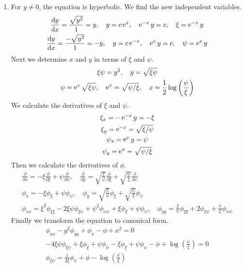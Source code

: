 {%
\begin{Solution}
  \label{solution transform phixx-y2phiyy+phix-phi+x2=0}
  \begin{enumerate}


  \item
    For $y \neq 0$, the equation is hyperbolic.  We find the new 
    independent variables.
    \begin{gather*}
      \frac{\mathrm{d} y}{\mathrm{d} x} = \frac{\sqrt{y^2}}{1} = y, \quad
      y = c \mathop{\mathrm{e}}\nolimits^x, \quad
      \mathop{\mathrm{e}}\nolimits^{-x} y = c, \quad
      \xi = \mathop{\mathrm{e}}\nolimits^{-x} y 
      \\
      \frac{\mathrm{d} y}{\mathrm{d} x} = \frac{-\sqrt{y^2}}{1} = -y, \quad
      y = c \mathop{\mathrm{e}}\nolimits^{-x}, \quad
      \mathop{\mathrm{e}}\nolimits^x y = c, \quad
      \psi = \mathop{\mathrm{e}}\nolimits^x y
    \end{gather*}
    Next we determine $x$ and $y$ in terms of $\xi$ and $\psi$.
    \begin{gather*}
      \xi \psi = y^2, \quad y = \sqrt{\xi \psi} 
      \\
      \psi = \mathop{\mathrm{e}}\nolimits^x \sqrt{\xi \psi}, \quad
      \mathop{\mathrm{e}}\nolimits^x = \sqrt{\psi / \xi}, \quad
      x = \frac{1}{2} \log \left( \frac{\psi}{\xi} \right)
    \end{gather*}
    We calculate the derivatives of $\xi$ and $\psi$.
    \begin{gather*}
      \xi_x = - \mathop{\mathrm{e}}\nolimits^{-x} y = - \xi 
      \\
      \xi_y = \mathop{\mathrm{e}}\nolimits^{-x} = \sqrt{\xi / \psi} 
      \\
      \psi_x = \mathop{\mathrm{e}}\nolimits^x y = \psi 
      \\
      \psi_y = \mathop{\mathrm{e}}\nolimits^x = \sqrt{\psi / \xi}
    \end{gather*}
    Then we calculate the derivatives of $\phi$.
    \begin{gather*}
      \frac{\partial}{\partial x} = - \xi \frac{\partial}{\partial \xi} + \psi \frac{\partial}{\partial \psi}, \quad
      \frac{\partial}{\partial y} = \sqrt{ \frac{\xi}{\psi} } \frac{\partial}{\partial \xi}
      + \sqrt{ \frac{\psi}{\xi} } \frac{\partial}{\partial \psi} 
      \\
      \phi_x = -\xi \phi_\xi + \psi \phi_\psi, \quad
      \phi_y = \sqrt{ \frac{\xi}{\psi} } \phi_\xi + \sqrt{ \frac{\psi}{\xi} } \phi_\psi 
      \\
      \phi_{x x} = \xi^2 \phi_{\xi \xi} - 2 \xi \psi \phi_{\xi \psi} + \psi^2 \phi_{\psi \psi} + \xi \phi_\xi + \psi \phi_\psi,
      \quad
      \phi_{y y} = \frac{\xi}{\psi} \phi_{\xi \xi} + 2 \phi_{\xi \psi} + \frac{\psi}{\xi} \phi_{\psi \psi}
    \end{gather*}
    Finally we transform the equation to canonical form.
    \begin{gather*}
      \phi_{x x} - y^2 \phi_{y y} + \phi_x - \phi + x^2 = 0 
      \\
      -4 \xi \psi \phi_{\xi \psi} + \xi \phi_\xi + \psi \phi_\psi - \xi \phi_\xi + \psi \phi_\psi - \phi
      + \log \left( \frac{\psi}{\xi} \right) = 0 
      \\
      \boxed{
        \phi_{\xi \psi} = \frac{1}{2 \xi} \phi_\psi + \phi
        - \log \left( \frac{\psi}{\xi} \right)
        }
    \end{gather*}
    

\end{enumerate}
\end{Solution}}
